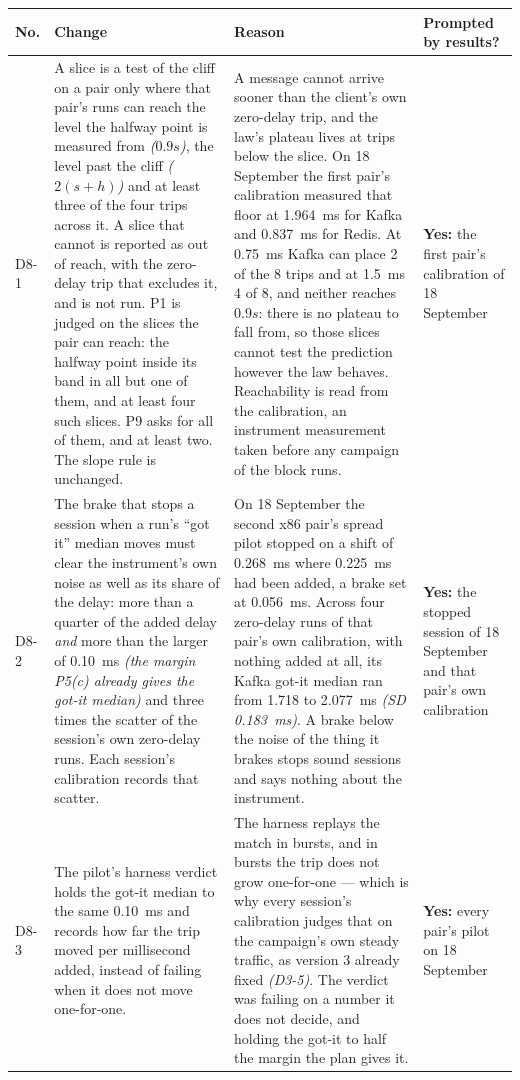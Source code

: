 \documentclass[11pt]{article}
\newcommand{\gl}[1]{{\color{soft}\itshape\small (#1)}}
\begin{document}
{\small
\begin{longtable}{@{}p{1.0cm} >{\raggedright\arraybackslash}p{6.2cm} >{\raggedright\arraybackslash}p{6.0cm} >{\raggedright\arraybackslash}p{2.2cm}@{}}
\toprule
\textbf{No.} & \textbf{Change} & \textbf{Reason} & \textbf{Prompted by results?} \\
\midrule
\endhead
D8-1 & A slice is a test of the cliff on a pair only where that pair's runs can reach the level the halfway point is measured from \gl{$0.9s$}, the level past the cliff \gl{$2(s+h)$} and at least three of the four trips across it. A slice that cannot is reported as out of reach, with the zero-delay trip that excludes it, and is not run. P1 is judged on the slices the pair can reach: the halfway point inside its band in all but one of them, and at least four such slices. P9 asks for all of them, and at least two. The slope rule is unchanged. & A message cannot arrive sooner than the client's own zero-delay trip, and the law's plateau lives at trips below the slice. On 18 September the first pair's calibration measured that floor at 1.964~ms for Kafka and 0.837~ms for Redis. At 0.75~ms Kafka can place 2 of the 8 trips and at 1.5~ms 4 of 8, and neither reaches $0.9s$: there is no plateau to fall from, so those slices cannot test the prediction however the law behaves. Reachability is read from the calibration, an instrument measurement taken before any campaign of the block runs. & \textbf{Yes:} the first pair's calibration of 18 September \\
D8-2 & The brake that stops a session when a run's ``got it'' median moves must clear the instrument's own noise as well as its share of the delay: more than a quarter of the added delay \emph{and} more than the larger of 0.10~ms \gl{the margin P5(c) already gives the got-it median} and three times the scatter of the session's own zero-delay runs. Each session's calibration records that scatter. & On 18 September the second x86 pair's spread pilot stopped on a shift of 0.268~ms where 0.225~ms had been added, a brake set at 0.056~ms. Across four zero-delay runs of that pair's own calibration, with nothing added at all, its Kafka got-it median ran from 1.718 to 2.077~ms \gl{SD 0.183~ms}. A brake below the noise of the thing it brakes stops sound sessions and says nothing about the instrument. & \textbf{Yes:} the stopped session of 18 September and that pair's own calibration \\
D8-3 & The pilot's harness verdict holds the got-it median to the same 0.10~ms and records how far the trip moved per millisecond added, instead of failing when it does not move one-for-one. & The harness replays the match in bursts, and in bursts the trip does not grow one-for-one --- which is why every session's calibration judges that on the campaign's own steady traffic, as version 3 already fixed \gl{D3-5}. The verdict was failing on a number it does not decide, and holding the got-it to half the margin the plan gives it. & \textbf{Yes:} every pair's pilot on 18 September \\
\bottomrule
\end{longtable}}
\end{document}
